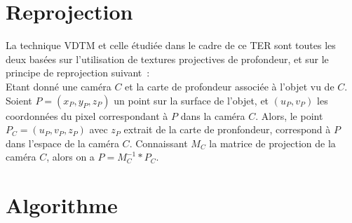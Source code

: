 \section{Reprojection}
La technique VDTM et celle étudiée dans le cadre de ce TER sont toutes les deux basées sur l'utilisation de textures
projectives de profondeur, et sur le principe de reprojection suivant~:\\
Etant donné une caméra $C$ et la carte de profondeur associée à l'objet vu de $C$.
Soient $P = (x_P, y_P, z_P)$ un point sur la surface de l'objet, et $(u_P, v_P)$ les coordonnées du pixel correspondant
à $P$ dans la caméra $C$. Alors, le point $P_C = (u_P, v_P, z_P)$ avec $z_P$ extrait de la carte de pronfondeur, correspond à $P$
dans l'espace de la caméra $C$. Connaissant $M_C$ la matrice de projection de la caméra $C$, alors on a $P = M_C^{-1} * P_C$.

\section{Algorithme}

